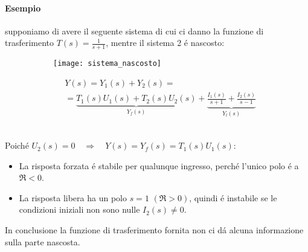 \documentclass[../main.tex]{subfiles}
\begin{document}
	\paragraph{Esempio} supponiamo di avere il seguente sistema di cui ci danno la funzione di trasferimento $ T(s) = \frac{1}{s+1} $, mentre il sistema 2 \'e nascosto:\\
	\begin{figure}[h!]
		\begin{subfigure}{0.5\textwidth}
			\texttt{[image: sistema\_nascosto]}
		\end{subfigure}
		\begin{subfigure}{0.5\textwidth}
			\begin{align*}
				&Y(s) = Y_1(s) + Y_2(s) =\\
				&= \underbrace{T_1(s)U_1(s) + T_2(s)U_2(s)}_{Y_f(s)} + \underbrace{\frac{I_1(s)}{s+1} + \frac{I_2(s)}{s-1}}_{Y_l(s)}
			\end{align*}
		\end{subfigure}
	\end{figure}
	\\
	Poich\'e $ U_2(s) = 0 \quad \Rightarrow \quad Y(s) = Y_f(s) = T_1(s)U_1(s)$:
	\begin{itemize}
		\item La risposta forzata \'e stabile per qualunque ingresso, perch\'e l'unico polo \'e a $ \Re < 0 $.
		\item La risposta libera ha un polo $ s = 1 $ $ (\Re > 0) $, quindi \'e instabile se le condizioni iniziali non sono nulle $ I_2(s) \neq 0 $.
	\end{itemize}
	In conclusione la funzione di trasferimento fornita non ci d\'a alcuna informazione sulla parte nascosta.\\ 
\end{document}
